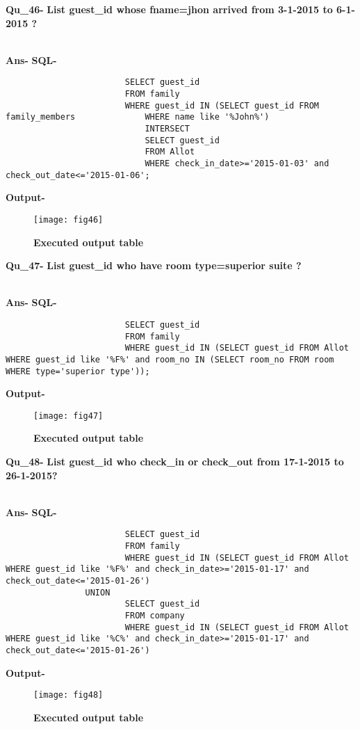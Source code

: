 \documentclass[a4,12pt]{report}
\begin{document}
\newpage
\textbf{Qu\_46-}  \textbf{List guest\_id whose fname=jhon arrived from 3-1-2015 to 6-1-2015  ?} \\\

\textbf{Ans-}		\textbf{SQL-}
\begin{lstlisting}
						SELECT guest_id 
						FROM family 
						WHERE guest_id IN (SELECT guest_id FROM family_members 				WHERE name like '%John%') 
							INTERSECT 
							SELECT guest_id 
							FROM Allot 
							WHERE check_in_date>='2015-01-03' and 			check_out_date<='2015-01-06'; 
\end{lstlisting}
\textbf{Output-} \\			   
\begin{figure}[hbtp]
\centering
\texttt{[image: fig46]}
\caption{\textbf{{\color{red}Executed output table}}}
\end{figure}

\textbf{Qu\_47-}  \textbf{List guest\_id who have room type=superior suite  ?} \\\

\textbf{Ans-}		\textbf{SQL-}
\begin{lstlisting}
						SELECT guest_id 
						FROM family 
						WHERE guest_id IN (SELECT guest_id FROM Allot WHERE guest_id like '%F%' and room_no IN (SELECT room_no FROM room WHERE type='superior type')); 

\end{lstlisting}
\textbf{Output-} \\			   
\begin{figure}[hbtp]
\centering
\texttt{[image: fig47]}
\caption{\textbf{{\color{red}Executed output table}}}
\end{figure}

\newpage
\textbf{Qu\_48-}  \textbf{List guest\_id who check\_in or check\_out from 17-1-2015 to 26-1-2015?} \\\

\textbf{Ans-}		\textbf{SQL-}
\begin{lstlisting}
						SELECT guest_id 
						FROM family 
						WHERE guest_id IN (SELECT guest_id FROM Allot WHERE guest_id like '%F%' and check_in_date>='2015-01-17' and check_out_date<='2015-01-26') 
				UNION
						SELECT guest_id 
						FROM company 
						WHERE guest_id IN (SELECT guest_id FROM Allot WHERE guest_id like '%C%' and check_in_date>='2015-01-17' and check_out_date<='2015-01-26') 
\end{lstlisting}
\textbf{Output-} \\			   
\begin{figure}[hbtp]
\centering
\texttt{[image: fig48]}
\caption{\textbf{{\color{red}Executed output table}}}
\end{figure}
\end{document}
